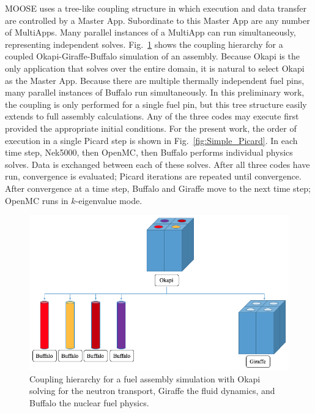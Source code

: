 \documentclass[letterpaper]{physor2018}
\begin{document}
MOOSE uses a tree-like coupling structure in which execution and data
transfer are controlled by a Master App.
Subordinate to this Master App are any number of MultiApps.
Many parallel instances of a MultiApp can
run simultaneously, representing independent solves.
Fig.~\ref{fig:MultiApps} shows the coupling hierarchy for a
coupled Okapi-Giraffe-Buffalo simulation of an assembly. Because Okapi is the
only application that solves over the entire domain, it is natural
 to select Okapi as the Master App. Because there are multiple thermally independent fuel pins,
many parallel instances of Buffalo run simultaneously.
In this preliminary work, the coupling
is only performed for a single fuel pin, but this tree
structure easily extends to full assembly calculations.
Any of the three codes may execute first provided the appropriate
initial conditions. For the present work, the order of execution in a single
Picard step is shown in Fig.~\ref{fig:Simple_Picard}.
In each time step, Nek5000, then OpenMC, then
Buffalo performs individual physics solves.
Data is exchanged between each of these solves.
After all three codes have run, convergence is evaluated;
Picard iterations are repeated
until convergence. After convergence at a time step,
Buffalo and Giraffe move to the next
time step; OpenMC runs in \(k\)-eigenvalue mode.

\begin{figure}[!htb]
  \centering
  \includegraphics[scale=0.4]{../Figures/heirarchy.png}
  \caption{Coupling hierarchy for a fuel assembly simulation with Okapi solving for the neutron transport, Giraffe the fluid dynamics, and Buffalo the nuclear fuel physics.}
  \label{fig:MultiApps}
\end{figure}
\end{document}
